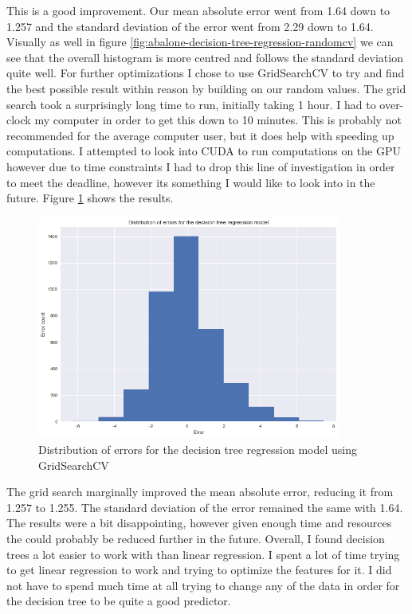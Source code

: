 This is a good improvement. Our mean absolute error went from 1.64 down to 1.257 and the standard deviation of the error went from 2.29 down to 1.64. Visually as well in figure \ref{fig:abalone-decision-tree-regression-randomcv} we can see that the overall histogram is more centred and follows the standard deviation quite well. 
For further optimizations I chose to use GridSearchCV to try and find the best possible result within reason by building on our random values. The grid search took a surprisingly long time to run, initially taking 1 hour. I had to over-clock my computer in order to get this down to 10 minutes. This is probably not recommended for the average computer user, but it does help with speeding up computations. I attempted to look into CUDA to run computations on the GPU however due to time constraints I had to drop this line of investigation in order to meet the deadline, however its something I would like to look into in the future. Figure \ref{fig:abalone-decision-tree-regression-gridcv} shows the results. 

\begin{figure}[H]
  \centering
  \includegraphics[scale=0.5,width=100mm]{./images/abalone-decision-tree-regression-gridcv.png}
  \caption{Distribution of errors for the decision tree regression model using GridSearchCV}
  \label{fig:abalone-decision-tree-regression-gridcv}
\end{figure}

The grid search marginally improved the mean absolute error, reducing it from 1.257 to 1.255. The standard deviation of the error remained the same with 1.64. The results were a bit disappointing, however given enough time and resources the could probably be reduced further in the future.
Overall, I found decision trees a lot easier to work with than linear regression. I spent a lot of time trying to get linear regression to work and trying to optimize the features for it. I did not have to spend much time at all trying to change any of the data in order for the decision tree to be quite a good predictor.